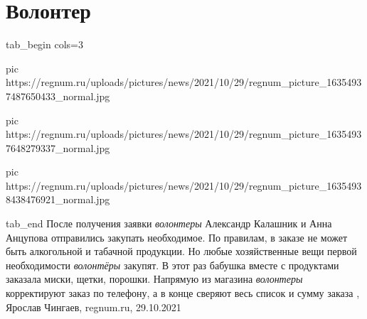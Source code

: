  
 
 
 
 
\chapter{Волонтер}


\ifcmt
  tab_begin cols=3

     pic https://regnum.ru/uploads/pictures/news/2021/10/29/regnum_picture_16354937487650433_normal.jpg

     pic https://regnum.ru/uploads/pictures/news/2021/10/29/regnum_picture_16354937648279337_normal.jpg

		 pic https://regnum.ru/uploads/pictures/news/2021/10/29/regnum_picture_16354938438476921_normal.jpg

  tab_end
\fi
После получения заявки \emph{волонтеры} Александр Калашник и Анна Анцупова отправились
закупать необходимое. По правилам, в заказе не может быть алкогольной и
табачной продукции. Но любые хозяйственные вещи первой необходимости \emph{волонтёры}
закупят. В этот раз бабушка вместе с продуктами заказала миски, щетки, порошки.
Напрямую из магазина \emph{волонтеры} корректируют заказ по телефону, а в конце
сверяют весь список и сумму заказа
, 
Ярослав Чингаев, regnum.ru, 29.10.2021

